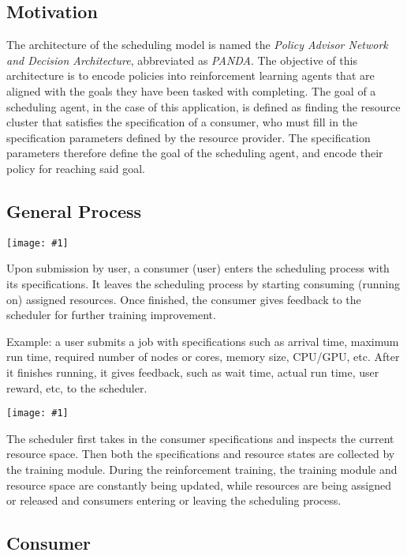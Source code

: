 \documentclass{article}
\theoremstyle{definition}
\theoremstyle{remark}
\newcommand{\addpic}[1]{\texttt{[image: \#1]}}
\begin{document}
	\subsection{Motivation}
	The architecture of the scheduling model is named the \emph{Policy Advisor Network and Decision Architecture},
	abbreviated as \emph{PANDA}. The objective of this architecture is to encode policies into reinforcement learning
    agents that are aligned with the goals they have been tasked with completing. The goal of a scheduling agent, in
    the case of this application, is defined as finding the resource cluster that satisfies the specification of a
    consumer, who must fill in the specification parameters defined by the resource provider. The specification
    parameters therefore define the goal of the scheduling agent, and encode their policy for reaching said goal.
	


	\subsection{General Process}
	
	\addpic{./figures/Intro1.jpg}	
	
	Upon submission by user, a consumer (user) enters the scheduling process with its specifications. It leaves the scheduling process by starting consuming (running on) assigned resources. Once finished, the consumer gives feedback to the scheduler for further training improvement.
	
	Example: a user submits a job with specifications such as arrival time, maximum run time, required number of nodes or cores, memory size, CPU/GPU, etc. After it finishes running, it gives feedback, such as wait time, actual run time, user reward, etc, to the scheduler.
	
	\addpic{./figures/Intro2.jpg}
	
	The scheduler first takes in the consumer specifications and inspects the current resource space. Then both the specifications and resource states are collected by the training module. During the reinforcement training, the training module and resource space are constantly being updated, while resources are being assigned or released and consumers entering or leaving the scheduling process.
	

	\subsection{Consumer}
	
\end{document}
